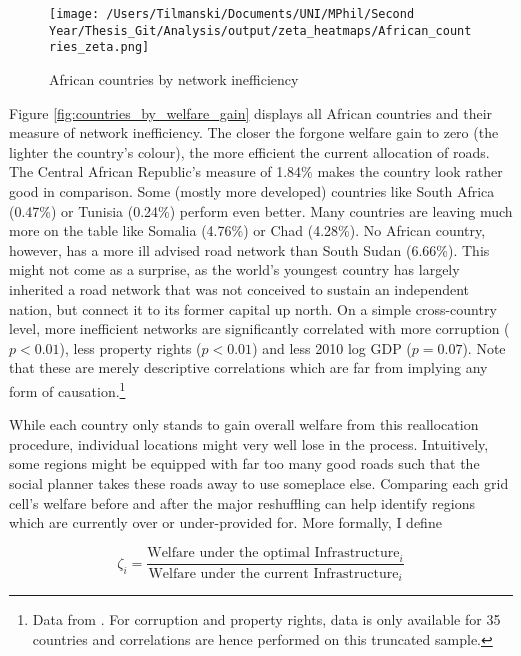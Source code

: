 \documentclass[11pt, oneside]{article}   	%
\begin{document}
\begin{figure}
\centering
\caption{African countries by network inefficiency}
\texttt{[image: /Users/Tilmanski/Documents/UNI/MPhil/Second Year/Thesis\_Git/Analysis/output/zeta\_heatmaps/African\_countries\_zeta.png]}

\label{fig:countries_by_welfare_gain}
\end{figure}

Figure \eqref{fig:countries_by_welfare_gain} displays all African countries and their measure of network inefficiency. The closer the forgone welfare gain to zero (the lighter the country's colour), the more efficient the current allocation of roads. The Central African Republic's measure of 1.84\% makes the country look rather good in comparison. Some (mostly more developed) countries like South Africa (0.47\%) or Tunisia (0.24\%) perform even better. Many countries are leaving much more on the table like Somalia (4.76\%) or Chad (4.28\%). No African country, however, has a more ill advised road network than South Sudan (6.66\%). This might not come as a surprise, as the world's youngest country has largely inherited a road network that was not conceived to sustain an independent nation, but connect it to its former capital up north. On a simple cross-country level, more inefficient networks are significantly correlated with more corruption ($p < 0.01$), less property rights ($p < 0.01$) and less 2010 log GDP ($p=0.07$). Note that these are merely descriptive correlations which are far from implying any form of causation.\footnote{Data from \cite{the_world_bank_world_2017}. For corruption and property rights, data is only available for 35 countries and correlations are hence performed on this truncated sample.}

While each country only stands to gain overall welfare from this reallocation procedure, individual locations might very well lose in the process. Intuitively, some regions might be equipped with far too many good roads such that the social planner takes these roads away to use someplace else. Comparing each grid cell's welfare before and after the major reshuffling can help identify regions which are currently over or under-provided for. More formally, I define

\begin{equation}
  \zeta_{i} = \frac{\textrm{Welfare under the optimal Infrastructure}_{i}}{\textrm{Welfare under the current Infrastructure}_{i}}
\end{equation}
\end{document}
